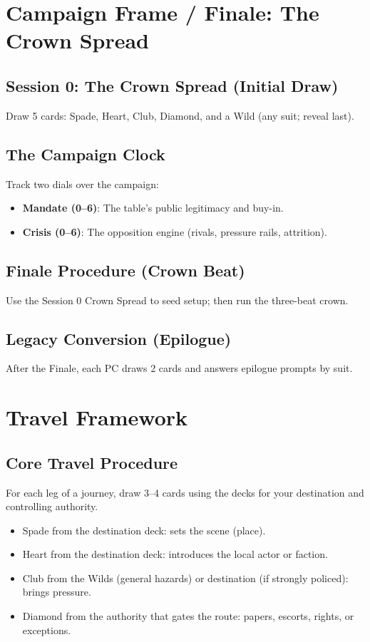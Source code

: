 \documentclass[11pt]{article}
\begin{document}
\section{Campaign Frame / Finale: The Crown Spread}

\subsection{Session 0: The Crown Spread (Initial Draw)}
Draw 5 cards: Spade, Heart, Club, Diamond, and a Wild (any suit; reveal last).

\subsection{The Campaign Clock}
Track two dials over the campaign:
\begin{itemize}
    \item \textbf{Mandate (0–6)}: The table's public legitimacy and buy-in.
    \item \textbf{Crisis (0–6)}: The opposition engine (rivals, pressure rails, attrition).
\end{itemize}

\subsection{Finale Procedure (Crown Beat)}
Use the Session 0 Crown Spread to seed setup; then run the three-beat crown.

\subsection{Legacy Conversion (Epilogue)}
After the Finale, each PC draws 2 cards and answers epilogue prompts by suit.

\section{Travel Framework}

\subsection{Core Travel Procedure}
For each leg of a journey, draw 3–4 cards using the decks for your destination and controlling authority.
\begin{itemize}
    \item Spade from the destination deck: sets the scene (place).
    \item Heart from the destination deck: introduces the local actor or faction.
    \item Club from the Wilds (general hazards) or destination (if strongly policed): brings pressure.
    \item Diamond from the authority that gates the route: papers, escorts, rights, or exceptions.
\end{itemize}
\end{document}
